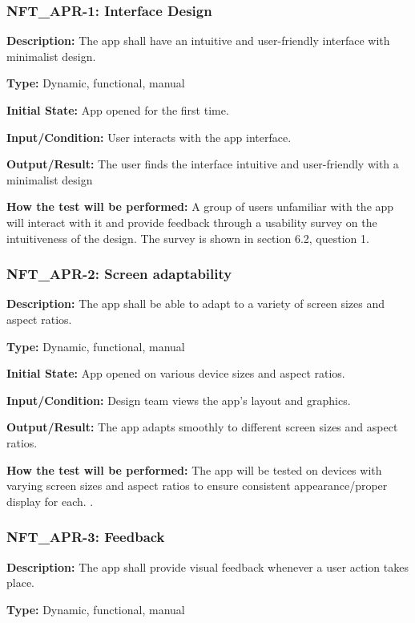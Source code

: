 \documentclass[12pt, titlepage]{article}
\begin{document}
\subsubsection*{\textbf{NFT\_APR-1: Interface Design}}

\textbf{Description:} The app shall have an intuitive and user-friendly interface with minimalist design. 

\textbf{Type:} Dynamic, functional, manual

\textbf{Initial State:} App opened for the first time.

\textbf{Input/Condition:} User interacts with the app interface.

\textbf{Output/Result:} The user finds the interface intuitive and user-friendly with a minimalist design

\textbf{How the test will be performed:} A group of users unfamiliar with the app will interact with it and provide feedback through a usability survey on the intuitiveness of the design. The survey is shown in section 6.2, question 1.  

\subsubsection*{\textbf{NFT\_APR-2: Screen adaptability}}

\textbf{Description:} The app shall be able to adapt to a variety of screen sizes and aspect ratios.

\textbf{Type:} Dynamic, functional, manual

\textbf{Initial State:} App opened on various device sizes and aspect ratios.

\textbf{Input/Condition:} Design team views the app's layout and graphics.

\textbf{Output/Result:} The app adapts smoothly to different screen sizes and aspect ratios.

\textbf{How the test will be performed:} The app will be tested on devices with varying screen sizes and aspect ratios to ensure consistent appearance/proper display for each. .


\subsubsection*{\textbf{NFT\_APR-3: Feedback}}


\textbf{Description:} The app shall provide visual feedback whenever a user action takes place.

\textbf{Type: }Dynamic, functional, manual
\end{document}
